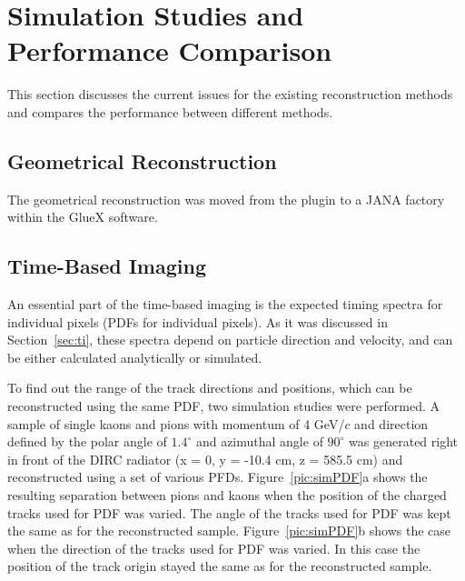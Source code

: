 \section{Simulation Studies and Performance Comparison}
\label{sec:com}

This section discusses the current issues for the existing reconstruction methods and compares the performance between different methods.

\subsection{Geometrical Reconstruction}

The geometrical reconstruction was moved from the plugin to a JANA factory within the GlueX software. 

\subsection{Time-Based Imaging}

An essential part of the time-based imaging is the expected timing spectra for individual pixels (PDFs for individual pixels). As it was discussed in Section~\ref{sec:ti}, these spectra depend on particle direction and velocity, and can be either calculated analytically or simulated.



To find out the range of the track directions and positions, which can be reconstructed using the same PDF, two simulation studies were performed. A sample of single kaons and pions with momentum of 4 GeV/$c$ and direction defined by the polar angle of $1.4^{\circ}$ and azimuthal angle of $90^{\circ}$ was generated right in front of the DIRC radiator (x = 0, y = -10.4 cm, z = 585.5 cm) and reconstructed using a set of various PFDs. Figure~\ref{pic:simPDF}a shows the resulting separation between pions and kaons when the position of the charged tracks used for PDF was varied. The angle of the tracks used for PDF was kept the same as for the reconstructed sample. Figure~\ref{pic:simPDF}b shows the case when the direction of the tracks used for PDF was varied. In this case the position of the track origin stayed the same as for the reconstructed sample.

